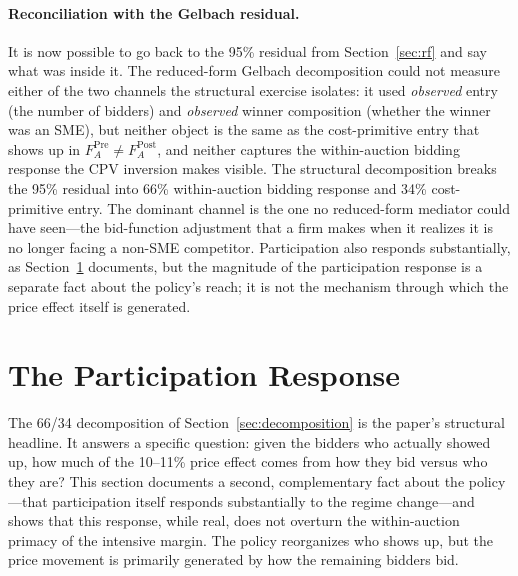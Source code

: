 \documentclass[12pt]{article}
\begin{document}
\paragraph{Reconciliation with the Gelbach residual.}
It is now possible to go back to the 95\% residual from
Section~\ref{sec:rf} and say what was inside it. The reduced-form
Gelbach decomposition could not measure either of the two channels
the structural exercise isolates: it used \emph{observed} entry
(the number of bidders) and \emph{observed} winner composition
(whether the winner was an SME), but neither object is the same
as the cost-primitive entry that shows up in
$F_A^{\text{Pre}} \neq F_A^{\text{Post}}$, and neither captures
the within-auction bidding response the CPV inversion makes
visible. The structural decomposition breaks the 95\% residual
into 66\% within-auction bidding response and 34\% cost-primitive
entry. The dominant channel is the one no reduced-form mediator
could have seen---the bid-function adjustment that a firm makes
when it realizes it is no longer facing a non-SME competitor.
Participation also responds substantially, as
Section~\ref{sec:endogenous} documents, but the magnitude of the
participation response is a separate fact about the policy's
reach; it is not the mechanism through which the price effect
itself is generated.

\section{The Participation Response}
\label{sec:endogenous}

The 66/34 decomposition of Section~\ref{sec:decomposition} is the
paper's structural headline. It answers a specific question: given
the bidders who actually showed up, how much of the 10--11\% price
effect comes from how they bid versus who they are? This section
documents a second, complementary fact about the policy---that
participation itself responds substantially to the regime
change---and shows that this response, while real, does not
overturn the within-auction primacy of the intensive margin. The
policy reorganizes who shows up, but the price movement is
primarily generated by how the remaining bidders bid.
\end{document}
